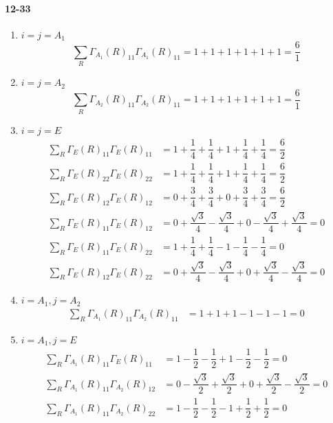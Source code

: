 \documentclass[a4paper]{article}
\newcommand{\ex}[1]{\paragraph{12-#1}}
\numberwithin{equation}{section}
\begin{document}
\ex{33}
\begin{enumerate}
	\item $ i=j=A_1 $
	\begin{equation}\label{key}
	\sum_R \Gamma_{A_1}(R)_{11}\Gamma_{A_1}(R)_{11} = 1 + 1 + 1 + 1 + 1 + 1 = \dfrac{6}{1}
	\end{equation}
	\item $ i=j=A_2 $
	\begin{equation}\label{key}
	\sum_R \Gamma_{A_2}(R)_{11}\Gamma_{A_2}(R)_{11} = 1 + 1 + 1 + 1 + 1 + 1 = \dfrac{6}{1}
	\end{equation}
	\item $ i=j=E $
	\begin{align}\label{key}
	\sum_R \Gamma_{E}(R)_{11}\Gamma_{E}(R)_{11} &= 1 + \dfrac{1}{4} + \dfrac{1}{4} + 1 + \dfrac{1}{4} + \dfrac{1}{4} = \dfrac{6}{2}\\
	\sum_R \Gamma_{E}(R)_{22}\Gamma_{E}(R)_{22} &= 1 + \dfrac{1}{4} + \dfrac{1}{4} + 1 + \dfrac{1}{4} + \dfrac{1}{4} = \dfrac{6}{2}\\
	\sum_R \Gamma_{E}(R)_{12}\Gamma_{E}(R)_{12} &= 0 + \dfrac{3}{4} + \dfrac{3}{4} + 0 + \dfrac{3}{4} + \dfrac{3}{4} = \dfrac{6}{2}\\
	\sum_R \Gamma_{E}(R)_{11}\Gamma_{E}(R)_{12} &= 0 + \dfrac{\sqrt{3}}{4} -\dfrac{\sqrt{3}}{4} + 0 - \dfrac{\sqrt{3}}{4} + \dfrac{\sqrt{3}}{4} = 0\\
	\sum_R \Gamma_{E}(R)_{11}\Gamma_{E}(R)_{22} &= 1 + \dfrac{1}{4} + \dfrac{1}{4} - 1 - \dfrac{1}{4} - \dfrac{1}{4} = 0\\
	\sum_R \Gamma_{E}(R)_{12}\Gamma_{E}(R)_{22} &= 0 + \dfrac{\sqrt{3}}{4} -\dfrac{\sqrt{3}}{4} + 0 + \dfrac{\sqrt{3}}{4} - \dfrac{\sqrt{3}}{4} = 0
	\end{align}
	\item $ i=A_1, j=A_2 $
	\begin{align}\label{key}
	\sum_R \Gamma_{A_1}(R)_{11}\Gamma_{A_2}(R)_{11} &= 1 + 1 + 1 - 1 - 1 - 1 = 0
	\end{align}
	\item $ i=A_1, j=E $
	\begin{align}\label{key}
	\sum_R \Gamma_{A_1}(R)_{11}\Gamma_{E}(R)_{11} &= 1  - \dfrac{1}{2} - \dfrac{1}{2} + 1 - \dfrac{1}{2} - \dfrac{1}{2} = 0\\
	\sum_R \Gamma_{A_1}(R)_{11}\Gamma_{A_2}(R)_{12} &= 0 -\dfrac{\sqrt{3}}{2} + \dfrac{\sqrt{3}}{2} + 0 + \dfrac{\sqrt{3}}{2} -\dfrac{\sqrt{3}}{2} = 0\\
	\sum_R \Gamma_{A_1}(R)_{11}\Gamma_{A_2}(R)_{22} &= 1 -\dfrac{1}{2} -\dfrac{1}{2} - 1 + \dfrac{1}{2} + \dfrac{1}{2} = 0

\end{align}
\end{enumerate}
\end{document}
